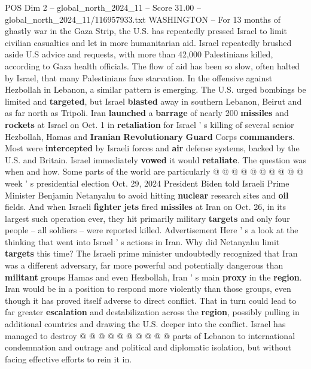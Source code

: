 \begin{textsample}{POS Dim 2 – global\_north\_2024\_11 – Score 31.00 – global\_north\_2024\_11/116957933.txt}  \label{ex:f2_pos_251}
WASHINGTON -- For 13 months of ghastly war in the Gaza Strip, the U.S. has repeatedly pressed Israel to limit civilian casualties and let in more humanitarian aid.
Israel repeatedly brushed aside U.S advice and requests, with more than 42,000 Palestinians killed, according to Gaza health officials.
The flow of aid has been so slow, often halted by Israel, that many Palestinians face starvation.
In the offensive against Hezbollah in Lebanon, a similar pattern is emerging.
The U.S. urged bombings be limited and \textbf{targeted}, but Israel \textbf{blasted} away in southern Lebanon, Beirut and as far north as Tripoli.
Iran \textbf{launched} a \textbf{barrage} of nearly 200 \textbf{missiles} and \textbf{rockets} at Israel on Oct. 1 in \textbf{retaliation} for Israel ' s killing of several senior Hezbollah, Hamas and \textbf{Iranian} \textbf{Revolutionary} \textbf{Guard} Corps \textbf{commanders}.
Most were \textbf{intercepted} by Israeli forces and \textbf{air} defense systems, backed by the U.S. and Britain.
Israel immediately \textbf{vowed} it would \textbf{retaliate}.
The question was when and how.
Some parts of the world are particularly @ @ @ @ @ @ @ @ @ @ week ' s presidential election Oct. 29, 2024 President Biden told Israeli Prime Minister Benjamin Netanyahu to avoid hitting \textbf{nuclear} research sites and \textbf{oil} fields.
And when Israeli \textbf{fighter} \textbf{jets} fired \textbf{missiles} at Iran on Oct. 26, in its largest such operation ever, they hit primarily military \textbf{targets} and only four people -- all soldiers -- were reported killed.
Advertisement Here ' s a look at the thinking that went into Israel ' s actions in Iran.
Why did Netanyahu limit \textbf{targets} this time?
The Israeli prime minister undoubtedly recognized that Iran was a different adversary, far more powerful and potentially dangerous than \textbf{militant} groups Hamas and even Hezbollah, Iran ' s main \textbf{proxy} in the \textbf{region}.
Iran would be in a position to respond more violently than those groups, even though it has proved itself adverse to direct conflict.
That in turn could lead to far greater \textbf{escalation} and destabilization across the \textbf{region}, possibly pulling in additional countries and drawing the U.S. deeper into the conflict.
Israel has managed to destroy @ @ @ @ @ @ @ @ @ @ parts of Lebanon to international condemnation and outrage and political and diplomatic isolation, but without facing effective efforts to rein it in.

\end{textsample}
